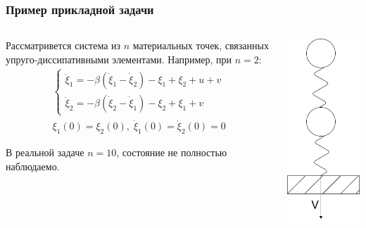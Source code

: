 \documentclass[aspectratio=1610]{beamer}
\begin{document}
\begin{frame}
  \frametitle{Пример прикладной задачи}
  \begin{columns}
    \begin{column}{0.7\textwidth}

      Рассматривется система из \(n\) материальных точек, связанных упруго-диссипативными элементами.
      Например, при \(n=2\):
      \begin{displaymath}
        \begin{array}{cr}
          \begin{cases}
            \ddot \xi_1 = -\beta(\dot\xi_1 - \dot\xi_2) - \xi_1 + \xi_2 + u + v \\
            \ddot \xi_2 = -\beta(\dot\xi_2 - \dot\xi_1) - \xi_2 + \xi_1 + v
          \end{cases} \\
          \xi_1(0)=\xi_2(0),\;\dot\xi_1(0)=\dot\xi_2(0)=0
      \end{array}
      \end{displaymath}

      В реальной задаче \(n=10\), состояние не полностью наблюдаемо.

    \end{column}
    \begin{column}{0.3\textwidth}
      \centerline{\includegraphics[width=.5\textwidth]{spring.png}}
    \end{column}
  \end{columns}

\end{frame}
\end{document}
